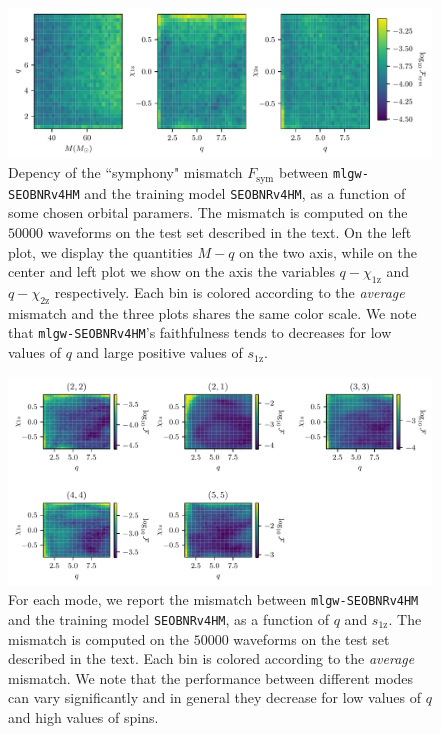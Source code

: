 \documentclass[twocolumn,showpacs,preprintnumbers,nofootinbib,prd,
superscriptaddress,10pt]{revtex4-1}
\begin{document}
\begin{figure}[t]
	\centering
	\includegraphics[width=\textwidth]{colormesh}
	\caption{
	Depency of the ``symphony" mismatch $F_\text{sym}$ between \texttt{mlgw-SEOBNRv4HM} and the training model \texttt{SEOBNRv4HM}, as a function of some chosen orbital paramers. The mismatch is computed on the $50000$ waveforms on the test set described in the text.
	On the left plot, we display the quantities $M-q$ on the two axis, while on the center and left plot we show on the axis the variables $q-\chi_\text{1z}$ and $q-\chi_\text{2z}$ respectively. 
	Each bin is colored according to the \textit{average} mismatch and the three plots shares the same color scale.
	We note that \texttt{mlgw-SEOBNRv4HM}'s faithfulness tends to decreases for low values of $q$ and large positive values of $s_\text{1z}$.
	}
	\label{fig:countour_plots}
\end{figure}

\begin{figure}[t]
	\centering
	\includegraphics[width=\textwidth]{colormesh_modes}
	\caption{
	For each mode, we report the mismatch between \texttt{mlgw-SEOBNRv4HM} and the training model \texttt{SEOBNRv4HM}, as a function of $q$ and $s_\text{1z}$. The mismatch is computed on the $50000$ waveforms on the test set described in the text.
	Each bin is colored according to the \textit{average} mismatch.
	We note that the performance between different modes can vary significantly and in general they decrease for low values of $q$ and high values of spins.
	}
	\label{fig:countour_plots_modes}
\end{figure}
\end{document}
